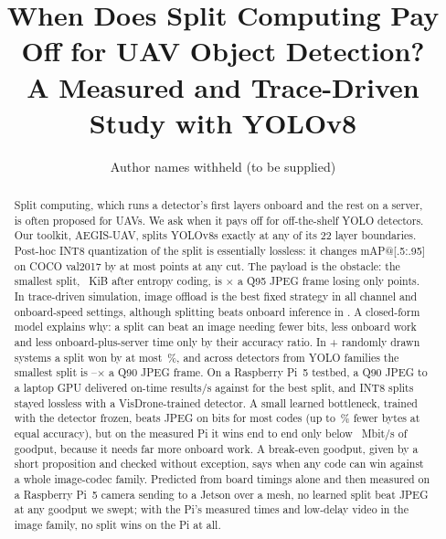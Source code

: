 \documentclass[journal,twocolumn,10pt]{IEEEtran}
\begin{document}
\title{When Does Split Computing Pay Off for UAV Object Detection?\\A Measured and Trace-Driven Study with YOLOv8}

\author{Author names withheld (to be supplied)}


\maketitle

\begin{abstract}
Split computing, which runs a detector's first layers onboard and the rest on a server, is often proposed for UAVs. We ask when it pays off for off-the-shelf YOLO detectors. Our toolkit, AEGIS-UAV, splits YOLOv8s exactly at any of its 22 layer boundaries. Post-hoc INT8 quantization of the split is essentially lossless: it changes mAP@[.5:.95] on COCO val2017 by at most \MaxAbsDeltaINT{} points at any cut. The payload is the obstacle: the smallest split, \MinSplitKiB~KiB after entropy coding, is \RatioMinSplitOverJPEGQNinetyFive$\times$ a Q95 JPEG frame losing only \JPEGLossQNinetyFive{} points. In trace-driven simulation, image offload is the best fixed strategy in all \NumCells{} channel and onboard-speed settings, although splitting beats onboard inference in \SplitBeatsOnboardCells{}. A closed-form model explains why: a split can beat an image needing fewer bits, less onboard work and less onboard-plus-server time only by their accuracy ratio. In \GenNScenarios{} + \GenNSwarmScenarios{} randomly drawn systems a split won by at most \GenMaxSplitGainPct\,\%, and across \GenNModels{} detectors from \GenNFamilies{} YOLO families the smallest split is \GenRatioMin--\GenRatioMax$\times$ a Q90 JPEG frame. On a Raspberry Pi~5 testbed, a Q90 JPEG to a laptop GPU delivered \HwJpegOnTime{} on-time results/s against \HwKOneOnTime{} for the best split, and INT8 splits stayed lossless with a VisDrone-trained detector. A small learned bottleneck, trained with the detector frozen, beats JPEG on bits for most codes (up to \LbKFourSavingMax\,\% fewer bytes at equal accuracy), but on the measured Pi it wins end to end only below \LbPiGoodput~Mbit/s of goodput, because it needs far more onboard work. A break-even goodput, given by a short proposition and checked without exception, says when any code can win against a whole image-codec family. Predicted from board timings alone and then measured on a Raspberry Pi~5 camera sending to a Jetson over a mesh, no learned split beat JPEG at any goodput we swept; with the Pi's measured times and low-delay video in the image family, no split wins on the Pi at all.
\end{abstract}
\end{document}
